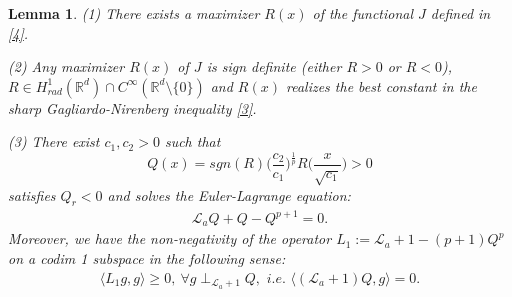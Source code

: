 \documentclass[12pt]{amsart}
\newcommand{\R}{\mathbb R}
\newcommand{\la}{\mathcal L_a}
\newtheorem{lemma}[theorem]{Lemma}
\begin{document}
\begin{lemma}\label{lm: existence}
(1) There exists a maximizer $R(x)$ of the functional $J$  defined in \eqref{4}.  

(2) Any maximizer $R(x)$ of $J$ is sign definite (either $R>0$ or $R<0$),  $R\in H^1_{rad}(\R^d)\cap C^{\infty}(\R^d\setminus \{0\})$ and  $R(x)$ realizes the best constant in the sharp Gagliardo-Nirenberg inequality \eqref{3}. 

(3) There exist $c_1, c_2>0$ such that 
\[
Q(x)=sgn(R)\bigl(\frac{c_2}{c_1}\bigr)^{\frac 1p}R\bigl(\frac x{\sqrt{c_1}}) >0
\]
satisfies $Q_r<0$ and solves the Euler-Lagrange equation:
\begin{align}\label{3.1}
\la Q+Q-Q^{p+1}=0. 
\end{align}
Moreover, we have the non-negativity of the operator $L_1:=\la+1-(p+1) Q^p$ on a codim 1 subspace in the following sense: 
\begin{align}\label{5.10}
\langle L_1 g, g\rangle\ge 0,\ \forall g\perp_{\la+1}  Q, \textit{ i.e. }\langle (\la+1) Q,g\rangle=0. 
\end{align}


\end{lemma}
\end{document}
